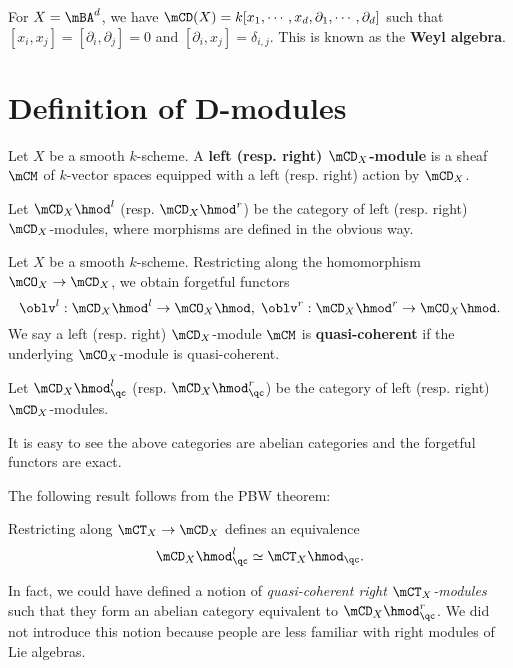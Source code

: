	\begin{exam}
		For $X=\mBA^d$, we have $\mCD(X) = k[x_1,\cdots,x_d, \partial_1,\cdots,\partial_d]$ such that $[x_i,x_j]=[\partial_i,\partial_j] =0$ and $[\partial_i,x_j]=\delta_{i,j}$. This is known as the \textbf{Weyl algebra}.
	\end{exam}

	

\section{Definition of D-modules}

	\begin{defn}
		Let $X$ be a smooth $k$-scheme. A \textbf{left (resp. right) $\mCD_X$-module} is a sheaf $\mCM$ of $k$-vector spaces equipped with a left (resp. right) action by $\mCD_X$.

		Let $\mCD_X\hmod^l$ (resp. $\mCD_X\hmod^r$) be the category of left (resp. right) $\mCD_X$-modules, where morphisms are defined in the obvious way.
	\end{defn}

	\begin{constr}
		Let $X$ be a smooth $k$-scheme. Restricting along the homomorphism $\mCO_X \to \mCD_X$, we obtain forgetful functors
		\[
			\oblv^l: \mCD_X\hmod^l\to \mCO_X\hmod,\; \oblv^r: \mCD_X\hmod^r\to \mCO_X\hmod.
		\]
		We say a left (resp. right) $\mCD_X$-module $\mCM$ is \textbf{quasi-coherent} if the underlying $\mCO_X$-module is quasi-coherent.

		Let $\mCD_X\hmod_\qc^l$ (resp. $\mCD_X\hmod_\qc^r$) be the category of left (resp. right) $\mCD_X$-modules.
	\end{constr}

	\begin{rem}
		It is easy to see the above categories are abelian categories and the forgetful functors are exact.
	\end{rem}

	The following result follows from the PBW theorem:

	\begin{prop}
		Restricting along $\mCT_X \to \mCD_X$ defines an equivalence
		\[
			\mCD_X\hmod^l_\qc \simeq \mCT_X\hmod_\qc.
		\]
	\end{prop}

	\begin{rem}
		In fact, we could have defined a notion of \emph{quasi-coherent right $\mCT_X$-modules} such that they form an abelian category equivalent to $\mCD_X\hmod^r_\qc$. We did not introduce this notion because people are less familiar with right modules of Lie algebras.
	\end{rem}

